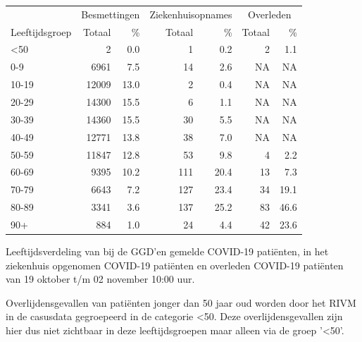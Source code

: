 \documentclass[
  english,
  man,floatsintext]{apa6}
\begin{document}
\begin{table}
\centering\begingroup\fontsize{11}{13}\selectfont

\begin{threeparttable}
\begin{tabular}{lrrrrrr}
\toprule
\multicolumn{1}{c}{ } & \multicolumn{2}{c}{Besmettingen} & \multicolumn{2}{c}{Ziekenhuisopnames} & \multicolumn{2}{c}{Overleden} \\
\cmidrule(l{3pt}r{3pt}){2-3} \cmidrule(l{3pt}r{3pt}){4-5} \cmidrule(l{3pt}r{3pt}){6-7}
Leeftijdsgroep & Totaal & \% & Totaal & \% & Totaal & \%\\
\midrule
<50 & 2 & 0.0 & 1 & 0.2 & 2 & 1.1\\
0-9 & 6961 & 7.5 & 14 & 2.6 & NA & NA\\
10-19 & 12009 & 13.0 & 2 & 0.4 & NA & NA\\
20-29 & 14300 & 15.5 & 6 & 1.1 & NA & NA\\
30-39 & 14360 & 15.5 & 30 & 5.5 & NA & NA\\
40-49 & 12771 & 13.8 & 38 & 7.0 & NA & NA\\
50-59 & 11847 & 12.8 & 53 & 9.8 & 4 & 2.2\\
60-69 & 9395 & 10.2 & 111 & 20.4 & 13 & 7.3\\
70-79 & 6643 & 7.2 & 127 & 23.4 & 34 & 19.1\\
80-89 & 3341 & 3.6 & 137 & 25.2 & 83 & 46.6\\
90+ & 884 & 1.0 & 24 & 4.4 & 42 & 23.6\\
\bottomrule
\end{tabular}
\begin{tablenotes}
\item[1] Leeftijdsverdeling van bij de GGD’en gemelde COVID-19 patiënten, in het ziekenhuis opgenomen COVID-19 patiënten en overleden COVID-19 patiënten van 19 oktober t/m 02 november 10:00 uur.
\item[2] Overlijdensgevallen van patiënten jonger dan 50 jaar oud worden door het RIVM in de casusdata gegroepeerd in de categorie <50. Deze overlijdensgevallen zijn hier dus niet zichtbaar in deze leeftijdsgroepen maar alleen via de groep '<50'.
\end{tablenotes}
\end{threeparttable}
\endgroup{}
\end{table}

\newpage
\end{document}
